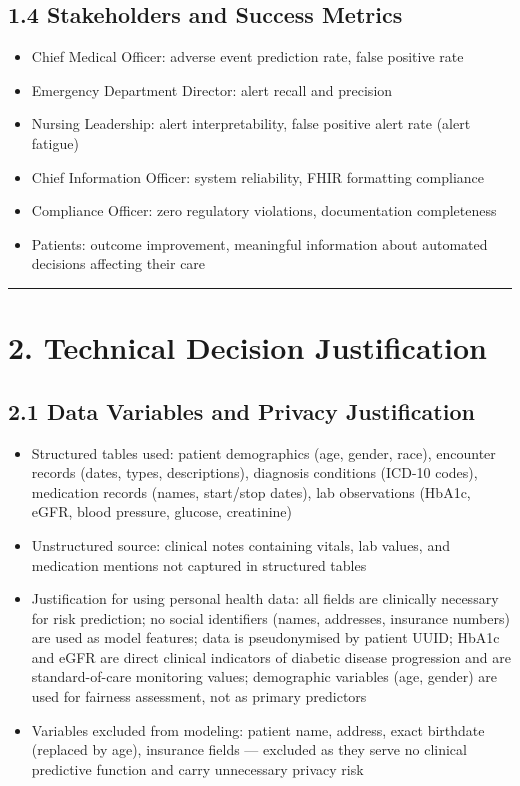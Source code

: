 \documentclass[11pt,a4paper]{article}
\begin{document}
\subsection{1.4 Stakeholders and Success Metrics}
\begin{itemize}
\item Chief Medical Officer: adverse event prediction rate, false positive rate
\item Emergency Department Director: alert recall and precision
\item Nursing Leadership: alert interpretability, false positive alert rate (alert fatigue)
\item Chief Information Officer: system reliability, FHIR formatting compliance
\item Compliance Officer: zero regulatory violations, documentation completeness
\item Patients: outcome improvement, meaningful information about automated decisions affecting their care
\end{itemize}

\noindent\rule{\linewidth}{0.4pt}

\section{2. Technical Decision Justification}

\subsection{2.1 Data Variables and Privacy Justification}
\begin{itemize}
\item Structured tables used: patient demographics (age, gender, race), encounter records (dates, types, descriptions), diagnosis conditions (ICD-10 codes), medication records (names, start/stop dates), lab observations (HbA1c, eGFR, blood pressure, glucose, creatinine)
\item Unstructured source: clinical notes containing vitals, lab values, and medication mentions not captured in structured tables
\item Justification for using personal health data: all fields are clinically necessary for risk prediction; no social identifiers (names, addresses, insurance numbers) are used as model features; data is pseudonymised by patient UUID; HbA1c and eGFR are direct clinical indicators of diabetic disease progression and are standard-of-care monitoring values; demographic variables (age, gender) are used for fairness assessment, not as primary predictors
\item Variables excluded from modeling: patient name, address, exact birthdate (replaced by age), insurance fields --- excluded as they serve no clinical predictive function and carry unnecessary privacy risk
\end{itemize}
\end{document}
